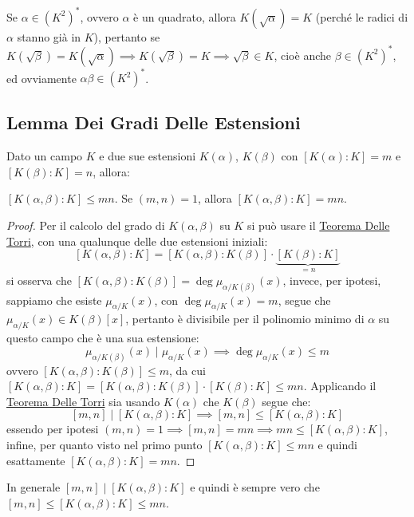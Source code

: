 \documentclass[11pt]{scrartcl}
\begin{document}
\begin{remark}
	Se $\alpha \in (K^2)^*$, ovvero $\alpha$ è un quadrato, allora $K(\sqrt{\alpha}) = K$ (perché le radici di $\alpha$ stanno già in $K$),
	pertanto se $K(\sqrt{\beta}) = K(\sqrt{\alpha}) \implies K(\sqrt{\beta}) = K \implies \sqrt{\beta} \in K$, cioè anche $\beta \in (K^2)^*$,
	ed ovviamente $\alpha\beta \in (K^2)^*$.
\end{remark}

\newpage
\subsection{Lemma Dei Gradi Delle Estensioni}

\begin{lemma}
Dato un campo $K$ e due sue estensioni $K(\alpha)$, $K(\beta)$ con $[K(\alpha) : K] = m$ e $[K(\beta) : K] = n$, allora:
	\begin{itemize}
	\ii $[K(\alpha,\beta) : K] \leq mn$.
	\ii Se $(m,n) = 1$, allora $[K(\alpha,\beta) : K] = mn$.
	\end{itemize}
\end{lemma}

\begin{proof}
	Per il calcolo del grado di $K(\alpha,\beta)$ su $K$ si può usare il \hyperref[es:Torri]{Teorema Delle Torri}, con una qualunque delle due estensioni iniziali:
		\[ [K(\alpha,\beta) : K] = [K(\alpha,\beta) : K(\beta)] \cdot \underbrace{[K(\beta) : K]}_{= n}
		\]
	si osserva che $[K(\alpha,\beta) : K(\beta)] = \deg \mu_{\alpha/K(\beta)}(x)$, invece, per ipotesi, sappiamo che esiste $\mu_{\alpha/K}(x)$,  con 
	$\deg \mu_{\alpha/K}(x) = m$, segue che $\mu_{\alpha/K}(x) \in K(\beta)[x]$, pertanto è divisibile per il polinomio minimo di $\alpha$ su questo campo che è una 
	sua estensione:
		\[ \mu_{\alpha/K(\beta)}(x) \mid \mu_{\alpha/K}(x) \implies \deg \mu_{\alpha/K}(x) \leq m
		\]
	ovvero $[K(\alpha,\beta) : K(\beta)] \leq m$, da cui $[K(\alpha,\beta) : K] = [K(\alpha,\beta) : K(\beta)] \cdot [K(\beta) : K] \leq mn$. Applicando il
	 \hyperref[es:Torri]{Teorema Delle Torri} sia usando $K(\alpha)$ che $K(\beta)$ segue che:
	 	\[ [m,n] \mid [K(\alpha,\beta) : K] \implies [m,n] \leq [K(\alpha,\beta) : K]
	 	\]
	essendo per ipotesi $(m,n) = 1 \implies [m,n] = mn \implies mn \leq [K(\alpha,\beta) : K]$, infine, per quanto visto nel primo punto $[K(\alpha,\beta) : K] \leq mn$ e quindi 
	esattamente $ [K(\alpha,\beta) : K] = mn$.
\end{proof}

\begin{remark}
In generale $[m,n] \mid [K(\alpha,\beta) : K]$ e quindi è sempre vero che $[m,n] \leq [K(\alpha,\beta) : K] \leq mn$.
\end{remark}
\end{document}
